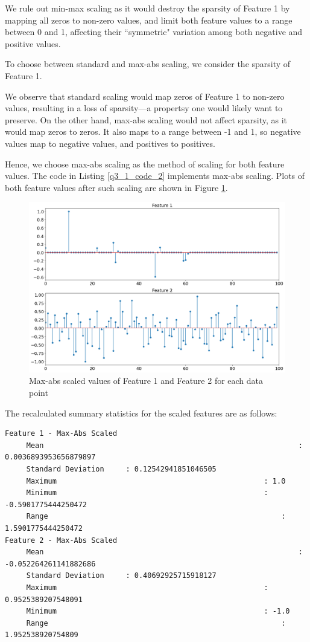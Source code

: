 \documentclass{article}[a4paper]
\begin{document}
	We rule out min-max scaling as it would destroy the sparsity of Feature 1 by mapping all zeros to non-zero values, and limit
	both feature values to a range between 0 and 1, affecting their ``symmetric" variation among both negative and positive values.
	\newline

	To choose between standard and max-abs scaling, we consider the sparsity of Feature 1.
	\newline
	
	We observe that standard scaling would map zeros of Feature 1 to non-zero values, resulting in a loss of sparsity---a propertsy
	one would likely want to preserve. On the other hand, max-abs scaling would not affect sparsity, as it would map zeros to zeros.
	It also maps to a range between -1 and 1, so negative values map to negative values, and positives to positives.
	\newline

	Hence, we choose max-abs scaling as the method of scaling for both feature values. The code in Listing \ref{q3_1_code_2} implements
	max-abs scaling. Plots of both feature values after such scaling are shown in Figure \ref{q3_1_2_img}.
	
	\begin{figure}[H]
		\centering
		\includegraphics[width=\linewidth]{images/q3_1_2.png}
		\caption{Max-abs scaled values of Feature 1 and Feature 2 for each data point}
		\label{q3_1_2_img}
	\end{figure}
	
	The recalculated summary statistics for the scaled features are as follows:
	\begin{verbatim}
Feature 1 - Max-Abs Scaled
	 Mean 															: 0.0036893953656879897
	 Standard Deviation 	: 0.12542941851046505
	 Maximum 												: 1.0
	 Minimum 												: -0.5901775444250472
	 Range 														: 1.5901775444250472
Feature 2 - Max-Abs Scaled
	 Mean 															: -0.052264261141882686
	 Standard Deviation 	: 0.40692925715918127
	 Maximum 												: 0.9525389207548091
	 Minimum 												: -1.0
	 Range 														: 1.952538920754809
	\end{verbatim}
\end{document}
